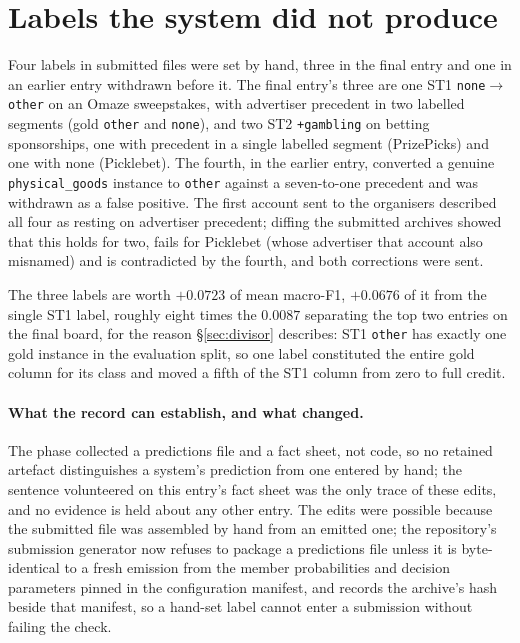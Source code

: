 \documentclass[11pt]{article}
\newcommand{\lab}[1]{\texttt{\small #1}}
\begin{document}
\section{Labels the system did not produce}
\label{sec:hand}

Four labels in submitted files were set by hand, three in the final entry and one in an earlier
entry withdrawn before it. The final entry's three are one ST1 \lab{none}$\rightarrow$\lab{other} on an Omaze
sweepstakes, with advertiser precedent in two labelled segments (gold \lab{other} and
\lab{none}), and two ST2 \lab{+gambling} on betting sponsorships, one with precedent in a single
labelled segment (PrizePicks) and one with none (Picklebet). The fourth, in the earlier entry,
converted a genuine \lab{physical\_goods} instance to \lab{other} against a seven-to-one
precedent and was withdrawn as a false positive. The first account sent to the organisers
described all four as resting on advertiser precedent; diffing the submitted archives showed
that this holds for two, fails for Picklebet (whose advertiser that account also misnamed) and
is contradicted by the fourth, and both corrections were sent.

The three labels are worth $+0.0723$ of mean macro-F1, $+0.0676$ of it from the single ST1
label, roughly eight times the $0.0087$ separating the top two entries on the final board, for
the reason \S\ref{sec:divisor} describes: ST1 \lab{other} has exactly one gold instance in the
evaluation split, so one label constituted the entire gold column for its class and moved a
fifth of the ST1 column from zero to full credit.

\paragraph{What the record can establish, and what changed.}
The phase collected a predictions file and a fact sheet, not code, so no retained artefact
distinguishes a system's prediction from one entered by hand; the sentence volunteered on this
entry's fact sheet was the only trace of these edits, and no evidence is held about any other
entry. The edits were possible because the submitted file was assembled by hand from an
emitted one; the repository's submission generator now refuses to package a predictions file
unless it is byte-identical to a fresh emission from the member probabilities and decision
parameters pinned in the configuration manifest, and records the archive's hash beside that
manifest, so a hand-set label cannot enter a submission without failing the check.
\end{document}
